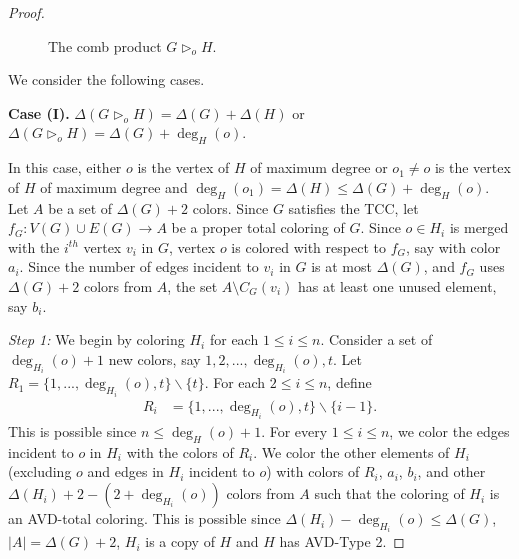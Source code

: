 \documentclass[12pt]{article}
\theoremstyle{definition}
\begin{document}
\begin{proof}
\begin{figure}[ht]
    \caption{The comb product $G \triangleright_o H$.}
    \label{Figure 4}
\end{figure}

We consider the following cases.

\textbf{Case (I).} $\Delta(G \triangleright_o H) = \Delta(G)+\Delta(H)$ or $\Delta(G \triangleright_o H) = \Delta(G)+\deg_H(o)$.

In this case, either $o$ is the vertex of $H$ of maximum degree or $o_1\ne o$ is the vertex of $H$ of maximum degree and $\deg_H(o_1)=\Delta(H)\leq \Delta(G)+\deg_H(o)$.
Let $A$ be a set of $\Delta(G)+2$ colors.
Since $G$ satisfies the TCC, let $f_G: V(G)\cup E(G)\rightarrow A$ be a proper total coloring of $G$.
Since $o\in H_i$ is merged with the $i^{th}$ vertex $v_i$ in $G$, vertex $o$ is colored with respect to $f_G$, say with color $a_i$. 
Since the number of edges incident to $v_i$ in $G$ is at most $\Delta(G)$, and $f_G$ uses $\Delta(G)+2$ colors from $A$, the set $A\setminus C_G(v_i)$ has at least one unused element, say $b_i$.

{\em Step 1:} 
We begin by coloring $H_i$ for each $1\leq i\leq n$.
Consider a set of $\deg_{H_i}(o)+1$ new colors, say $1,2,..., \deg_{H_i}(o),t$. 
Let $R_1 = \{1,...,\deg_{H_i}(o),t\}\backslash \{t\}$.
For each $2\le i\le n$, define
\[
\begin{aligned}
R_i &= \{1,...,\deg_{H_i}(o),t\}\backslash \{i-1\}.
\end{aligned}
\]
This is possible since $n\leq \deg_{H}(o)+1$. For every $1\leq i\leq n$, we color the edges incident to $o$ in $H_i$ with the colors of $R_i$.
We color the other elements of $H_i$ (excluding $o$ and edges in $H_i$ incident to $o$) with colors of $R_i$, $a_i$, $b_i$, and other $\Delta(H_i)+2-(2+\deg_{H_i}(o))$ colors from $A$ such that the coloring of $H_i$ is an AVD-total coloring. This is possible since 
$\Delta(H_i)-\deg_{H_i}(o)\leq \Delta(G)$, $|A|=\Delta(G)+2$,
$H_i$ is a copy of $H$ and $H$ has AVD-Type 2.


\end{proof}
\end{document}
